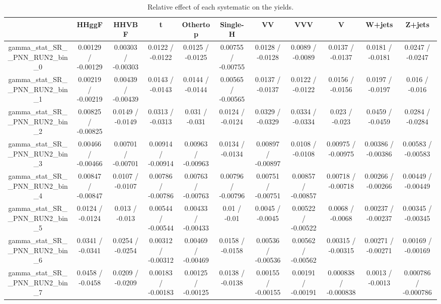 \documentclass[10pt]{article}
\begin{document}
\begin{table}[htbp]
\begin{center}
\begin{tabular}{|c|c|c|c|c|c|c|c|c|c|c|}
\hline 
      & HHggF      & HHVBF      & t      & Othertop      & Single-H      & VV      & VVV      & V      & W+jets      & Z+jets \\ 
\hline 
  gamma_stat_SR__PNN_RUN2_bin_0 & 0.00129 / -0.00129 & 0.00303 / -0.00303 & 0.0122 / -0.0122 & 0.0125 / -0.0125 & 0.00755 / -0.00755 & 0.0128 / -0.0128 & 0.0089 / -0.0089 & 0.0137 / -0.0137 & 0.0181 / -0.0181 & 0.0247 / -0.0247 \\ 
  gamma_stat_SR__PNN_RUN2_bin_1 & 0.00219 / -0.00219 & 0.00439 / -0.00439 & 0.0143 / -0.0143 & 0.0144 / -0.0144 & 0.00565 / -0.00565 & 0.0137 / -0.0137 & 0.0122 / -0.0122 & 0.0156 / -0.0156 & 0.0197 / -0.0197 & 0.016 / -0.016 \\ 
  gamma_stat_SR__PNN_RUN2_bin_2 & 0.00825 / -0.00825 & 0.0149 / -0.0149 & 0.0313 / -0.0313 & 0.031 / -0.031 & 0.0124 / -0.0124 & 0.0329 / -0.0329 & 0.0334 / -0.0334 & 0.023 / -0.023 & 0.0459 / -0.0459 & 0.0284 / -0.0284 \\ 
  gamma_stat_SR__PNN_RUN2_bin_3 & 0.00466 / -0.00466 & 0.00701 / -0.00701 & 0.00914 / -0.00914 & 0.00963 / -0.00963 & 0.0134 / -0.0134 & 0.00897 / -0.00897 & 0.0108 / -0.0108 & 0.00975 / -0.00975 & 0.00386 / -0.00386 & 0.00583 / -0.00583 \\ 
  gamma_stat_SR__PNN_RUN2_bin_4 & 0.00847 / -0.00847 & 0.0107 / -0.0107 & 0.00786 / -0.00786 & 0.00763 / -0.00763 & 0.00796 / -0.00796 & 0.00751 / -0.00751 & 0.00857 / -0.00857 & 0.00718 / -0.00718 & 0.00266 / -0.00266 & 0.00449 / -0.00449 \\ 
  gamma_stat_SR__PNN_RUN2_bin_5 & 0.0124 / -0.0124 & 0.013 / -0.013 & 0.00544 / -0.00544 & 0.00433 / -0.00433 & 0.01 / -0.01 & 0.0045 / -0.0045 & 0.00522 / -0.00522 & 0.0068 / -0.0068 & 0.00237 / -0.00237 & 0.00345 / -0.00345 \\ 
  gamma_stat_SR__PNN_RUN2_bin_6 & 0.0341 / -0.0341 & 0.0254 / -0.0254 & 0.00312 / -0.00312 & 0.00469 / -0.00469 & 0.0158 / -0.0158 & 0.00536 / -0.00536 & 0.00562 / -0.00562 & 0.00315 / -0.00315 & 0.00271 / -0.00271 & 0.00169 / -0.00169 \\ 
  gamma_stat_SR__PNN_RUN2_bin_7 & 0.0458 / -0.0458 & 0.0209 / -0.0209 & 0.00183 / -0.00183 & 0.00125 / -0.00125 & 0.0138 / -0.0138 & 0.00155 / -0.00155 & 0.00191 / -0.00191 & 0.000838 / -0.000838 & 0.0013 / -0.0013 & 0.000786 / -0.000786 \\ 
\hline 
\end{tabular} 
\caption{Relative effect of each systematic on the yields.} 
\end{center} 
\end{table} 
\end{document}

